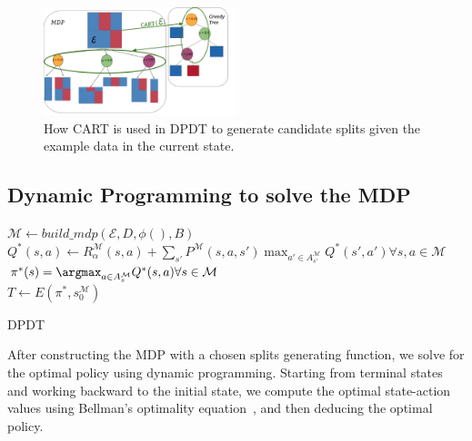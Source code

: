 \begin{figure}
      \centering
      \includegraphics[trim={0 0cm 0 0},clip,width=0.5\textwidth]{images/figures/schematic_cart_node_select.pdf}
      \caption{How CART is used in DPDT to generate candidate splits given the example data in the current state.}\label{fig:schema-dpdt}
\end{figure}



\subsection{Dynamic Programming to solve the MDP}
        \begin{algorithm}
            $\mathcal{M} \gets build\_mdp(\mathcal{E}, D, \phi(), B)$\label{line:build_mdp} \\
            $Q^*(s,a) \gets R_{\alpha}^{\mathcal{M}}(s,a) + \sum_{s'} P^{\mathcal{M}}(s,a,s') \max_{a' \in A_{s'}^{\mathcal{M}}} Q^*(s',a') \forall s,a \in \mathcal{M}$\\
            $\pi^*(s) = \argmax_{a \in A_s^{\mathcal{M}}} Q^*(s, a) \forall s \in \mathcal{M} $\\
            $T \gets E(\pi^*,s_0^{\mathcal{M}}) $
            \caption{DPDT}\label{alg:dpdt}
        \end{algorithm}
        
After constructing the MDP with a chosen splits generating function, we solve for the optimal policy using dynamic programming. Starting from terminal states and working backward to the initial state, we compute the optimal state-action values using Bellman's optimality equation~\cite{BELLMAN1958228}, and then deducing the optimal policy.

